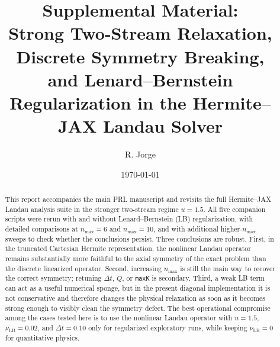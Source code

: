 \documentclass[11pt]{article}
\title{Supplemental Material:\\Strong Two-Stream Relaxation, Discrete Symmetry Breaking,\\and Lenard--Bernstein Regularization in the Hermite--JAX Landau Solver}
\author{R. Jorge}
\date{\today}
\begin{document}
\maketitle

\begin{abstract}
This report accompanies the main PRL manuscript and revisits the full Hermite--JAX Landau analysis suite in the stronger two-stream regime $u=1.5$.
All five companion scripts were rerun with and without Lenard--Bernstein (LB) regularization, with detailed comparisons at $n_{\max}=6$ and $n_{\max}=10$, and with additional higher-$n_{\max}$ sweeps to check whether the conclusions persist.
Three conclusions are robust.
First, in the truncated Cartesian Hermite representation, the nonlinear Landau operator remains substantially more faithful to the axial symmetry of the exact problem than the discrete linearized operator.
Second, increasing $n_{\max}$ is still the main way to recover the correct symmetry; retuning $\Delta t$, $Q$, or \texttt{maxK} is secondary.
Third, a weak LB term can act as a useful numerical sponge, but in the present diagonal implementation it is not conservative and therefore changes the physical relaxation as soon as it becomes strong enough to visibly clean the symmetry defect.
The best operational compromise among the cases tested here is to use the nonlinear Landau operator with $u=1.5$, $\nu_{\mathrm{LB}}=0.02$, and $\Delta t=0.10$ only for regularized exploratory runs, while keeping $\nu_{\mathrm{LB}}=0$ for quantitative physics.
\end{abstract}
\end{document}

